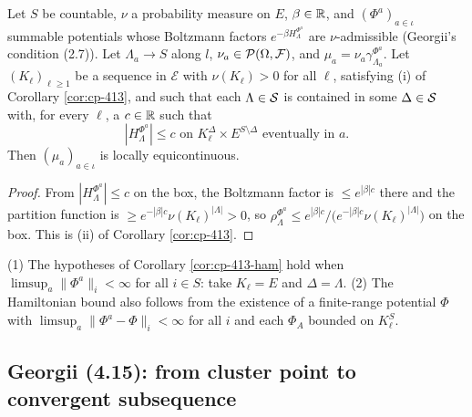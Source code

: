 \begin{corollary}
    \label{cor:cp-413-ham}
    \leanok

    Let $S$ be countable, $\nu$ a probability measure on $E$, $\beta \in \mathbb{R}$, and
    $(\Phi^a)_{a \in \iota}$ summable potentials whose Boltzmann factors
    $e^{-\beta H^{\Phi^a}_\Lambda}$ are $\nu$-admissible (Georgii's condition (2.7)). Let
    $\Lambda_a \to S$ along $l$, $\nu_a \in \mathcal{P}(\Omega, \mathcal{F})$, and
    $\mu_a = \nu_a \gamma^{\Phi^a}_{\Lambda_a}$. Let $(K_\ell)_{\ell \geq 1}$ be a sequence in
    $\mathcal{E}$ with $\nu(K_\ell) > 0$ for all $\ell$, satisfying (i) of
    Corollary \ref{cor:cp-413}, and such that each $\Lambda \in \mathcal{S}$ is contained in some
    $\Delta \in \mathcal{S}$ with, for every $\ell$, a $c \in \mathbb{R}$ such that
    \[|H^{\Phi^a}_\Lambda| \leq c \text{ on } K_\ell^\Delta \times E^{S\setminus\Delta}
      \text{ eventually in } a.\]
    Then $(\mu_a)_{a \in \iota}$ is locally equicontinuous.
\end{corollary}
\begin{proof}
    \leanok

    From $|H^{\Phi^a}_\Lambda| \leq c$ on the box, the Boltzmann factor is
    $\leq e^{|\beta|c}$ there and the partition function is
    $\geq e^{-|\beta|c}\nu(K_\ell)^{|\Lambda|} > 0$, so
    $\rho^{\Phi^a}_\Lambda \leq e^{|\beta|c}\big/\big(e^{-|\beta|c}\nu(K_\ell)^{|\Lambda|}\big)$
    on the box. This is (ii) of Corollary \ref{cor:cp-413}.
\end{proof}

\begin{remark}[Georgii (4.14)]
    \label{rmk:cp-414}

    (1) The hypotheses of Corollary \ref{cor:cp-413-ham} hold when
    $\limsup_{a} \|\Phi^a\|_i < \infty$ for all $i \in S$: take $K_\ell = E$ and
    $\Delta = \Lambda$.
    (2) The Hamiltonian bound also follows from the existence of a finite-range potential
    $\Phi$ with $\limsup_{a} \|\Phi^a - \Phi\|_i < \infty$ for all $i$ and each $\Phi_A$
    bounded on $K_\ell^S$.
\end{remark}

\subsection*{Georgii (4.15): from cluster point to convergent subsequence}


